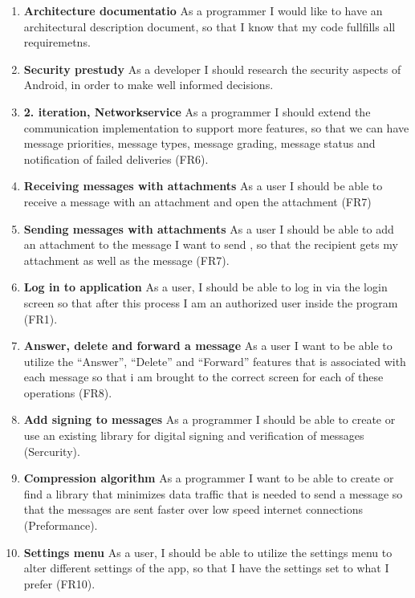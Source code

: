 \begin{enumerate}
			\item {\bf Architecture documentatio} As a programmer I would like to have an architectural description document, so that I know that my code fullfills all requiremetns.
			\item {\bf Security prestudy} As a developer I should research the security aspects of Android, in order to make well informed decisions.
			\item {\bf 2. iteration, Networkservice} As a programmer I should extend the communication implementation to support more features, so that we can have message priorities, message types, message grading, message status and notification of failed deliveries (FR6).
			\item {\bf Receiving messages with attachments} As a user I should be able to receive a message with an attachment and open the attachment (FR7)
			\item {\bf Sending messages with attachments} As a user I should be able to add an attachment to the message I want to send , so that the recipient gets my attachment as well as the message (FR7). 
			\item {\bf Log in to application} As a user, I should be able to log in via the login screen so that after this process I am an authorized user inside the program (FR1).
			\item {\bf Answer, delete and forward a message} As a user I want to be able to utilize the ``Answer'', ``Delete'' and ``Forward'' features that is associated with each message so that i am brought to the correct screen for each of these operations (FR8).
			\item {\bf Add signing to messages} As a programmer I should be able to create or use an existing library for digital signing and verification of messages (Sercurity).
			\item {\bf Compression algorithm} As a programmer I want to be able to create or find a library that minimizes data traffic that is needed to send a message so that the messages are sent faster over low speed internet connections (Preformance).
			\item {\bf Settings menu} As a user, I should be able to utilize the settings menu to alter different settings of the app, so that I have the settings set to what I prefer (FR10).
			
			
			

\end{enumerate}
